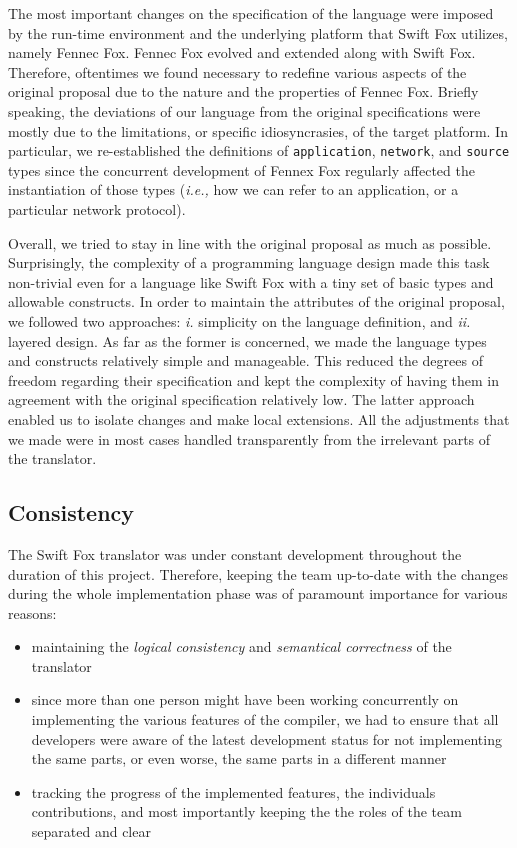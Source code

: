 The most important changes on the specification of the language were
imposed by the run-time environment and the underlying platform that
Swift Fox utilizes, namely Fennec Fox. Fennec Fox evolved and extended
along with Swift Fox. Therefore, oftentimes we found necessary to redefine
various aspects of the original proposal due to the nature and the
properties of Fennec Fox. Briefly speaking, the deviations of our language
from the original specifications were mostly due to the limitations, or
specific idiosyncrasies, of the target platform. In particular, we
re-established the definitions of \texttt{application}, \texttt{network},
and \texttt{source} types since the concurrent development of Fennex Fox
regularly affected the instantiation of those types (\textit{i.e.,} how
we can refer to an application, or a particular network protocol).

Overall, we tried to stay in line with the original proposal as much as
possible. Surprisingly, the complexity of a programming language design
made this task non-trivial even for a language like Swift Fox with a tiny
set of basic types and allowable constructs. In order to maintain the
attributes of the original proposal, we followed two approaches:
\textit{i.} simplicity on the language definition, and \textit{ii.} layered
design. As far as the former is concerned, we made the language types and
constructs relatively simple and manageable. This reduced the degrees of
freedom regarding their specification and kept the complexity of having 
them in agreement with the original specification relatively low. The
latter approach enabled us to isolate changes and make local extensions.
All the adjustments that we made were in most cases handled transparently
from the irrelevant parts of the translator.

\subsection{Consistency}

The Swift Fox translator was under constant development throughout the
duration of this project. Therefore, keeping the team up-to-date with the
changes during the whole implementation phase was of paramount importance
for various reasons:
\begin{itemize}
	\item maintaining the \textit{logical consistency} and
	\textit{semantical correctness} of the translator
	\item since more than one person might have been working
	concurrently on implementing the various features of the compiler,
	we had to ensure that all developers were aware of the latest
	development status for not implementing the same parts, or even
	worse, the same parts in a different manner
	\item tracking the progress of the implemented features, the
	individuals contributions, and most importantly keeping the the
	roles of the team separated and clear
\end{itemize}

